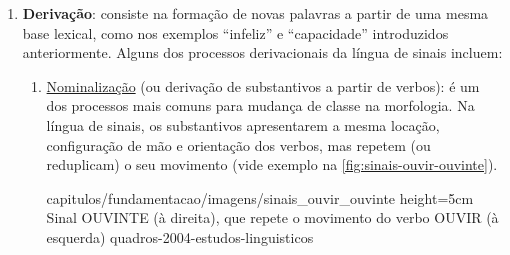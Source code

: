 

\begin{enumerate}
    \item \textbf{Derivação}: consiste na formação de novas palavras a partir de uma mesma base lexical, como nos exemplos ``infeliz'' e ``capacidade'' introduzidos anteriormente. Alguns dos processos derivacionais da língua de sinais incluem:
    

    \begin{enumerate}
        \item \underline{Nominalização} (ou derivação de substantivos a partir de verbos): é um dos processos mais comuns para mudança de classe na morfologia. Na língua de sinais, os substantivos apresentarem a mesma locação, configuração de mão e orientação dos verbos, mas repetem (ou reduplicam) o seu movimento (vide exemplo na \autoref{fig:sinais-ouvir-ouvinte}).
        
            {capitulos/fundamentacao/imagens/sinais_ouvir_ouvinte} %
            {height=5cm} %
            {Sinal OUVINTE (à direita), que repete o movimento do verbo OUVIR (à esquerda)} %
            {quadros-2004-estudos-linguisticos} %
        





\end{enumerate}
\end{enumerate}
